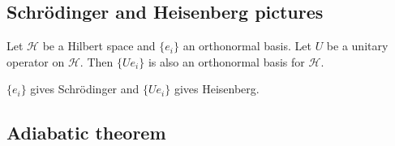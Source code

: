 \subsection{Schrödinger and Heisenberg pictures}
\begin{lemma}
Let $\mathcal{H}$ be a Hilbert space and $\{e_i\}$ an orthonormal basis. Let $U$ be a unitary operator on $\mathcal{H}$. Then $\{Ue_i\}$ is also an orthonormal basis for $\mathcal{H}$.
\end{lemma}
$\{e_i\}$ gives Schrödinger and $\{Ue_i\}$ gives Heisenberg.



\subsection{Adiabatic theorem}

